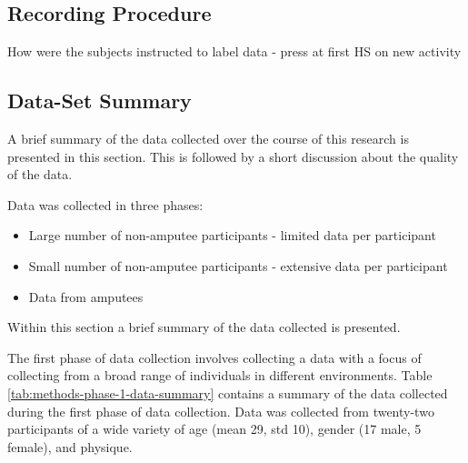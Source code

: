 \subsection{Recording Procedure}
How were the subjects instructed to label data - press at first HS on new activity


\subsection{Data-Set Summary} %
A brief summary of the data collected over the course of this research is presented in this section. This is followed by a short discussion about the quality of the data.

Data was collected in three phases:
\begin{itemize}
    \item Large number of non-amputee participants - limited data per participant
    \item Small number of non-amputee participants - extensive data per participant
    \item Data from amputees
\end{itemize}
Within this section a brief summary of the data collected is presented.

The first phase of data collection involves collecting a data with a focus of collecting from a broad range of individuals in different environments. Table \ref{tab:methods-phase-1-data-summary} contains a summary of the data collected during the first phase of data collection. Data was collected from twenty-two participants of a wide variety of age (mean 29, std 10), gender (17 male, 5 female), and physique.

